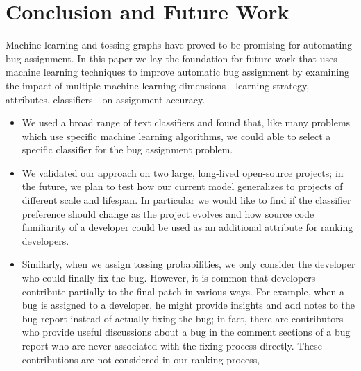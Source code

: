 
\chapter{Conclusion and Future Work} %
Machine learning and tossing graphs have proved to be promising for automating bug assignment. In this paper we lay the foundation for future work
that uses machine learning techniques to improve automatic bug assignment
by examining the impact of multiple machine learning dimensions—learning
strategy, attributes, classifiers—on assignment accuracy.
\begin{itemize}
\item We used a broad range of text classifiers and found that, like many problems which use specific machine learning algorithms, we could able to select a specific classifier for the bug assignment problem.

\item We validated our approach on two large, long-lived open-source projects; in the future, we plan to test how our current model generalizes to projects of
different scale and lifespan. In particular we would like to find if the classifier preference should change as the project evolves and how source code familiarity of a developer could be used as an additional attribute for ranking developers.

\item Similarly, when we assign tossing probabilities, we only consider the developer who could finally fix the bug. However, it is common that developers contribute
partially to the final patch in various ways. For example, when a bug is assigned
to a developer, he might provide insights and add notes to the bug report instead of actually fixing the bug; in fact, there are contributors who provide
useful discussions about a bug in the comment sections of a bug report who
are never associated with the fixing process directly. These contributions are
not considered in our ranking process,

\end{itemize}

